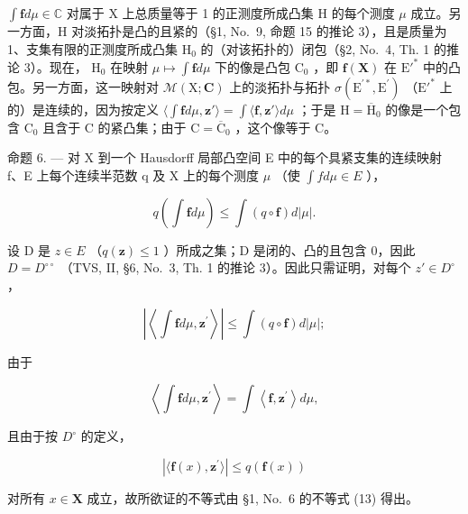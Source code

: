 \(\int \mathbf{f}d\mu \in \mathbb{C}\) 对属于 X 上总质量等于 1 的正测度所成凸集 H 的每个测度 \(\mu\) 成立。另一方面，H 对淡拓扑是凸的且紧的（§1, No.~9, 命题 15 的推论 3），且是质量为 1、支集有限的正测度所成凸集 \(\mathrm{H}_0\) 的（对该拓扑的）闭包（§2, No.~4, Th. 1 的推论 3）。现在， \(\mathrm{H}_0\) 在映射 \(\mu \mapsto \int \mathbf{f}d\mu\) 下的像是凸包 \(\mathrm{C}_0\) ，即 \(\mathbf{f}(\mathbf{X})\) 在 \(\mathrm{E}'^*\) 中的凸包。另一方面，这一映射对 \(\mathcal{M}(\mathrm{X};\mathbf{C})\) 上的淡拓扑与拓扑 \(\sigma (\mathrm{E}^{\prime *},\mathrm{E}^{\prime})\) （\(\mathrm{E}'^*\) 上的）是连续的，因为按定义 \(\langle \int \mathbf{f}d\mu ,\mathbf{z}'\rangle = \int \langle \mathbf{f},\mathbf{z}'\rangle d\mu\) ；于是 \(\mathrm{H} = \overline{\mathrm{H}}_0\) 的像是一个包含 \(\mathrm{C}_0\) 且含于 C 的紧凸集；由于 \(\mathrm{C} = \overline{\mathrm{C}}_0\) ，这个像等于 C。

命题 6. --- 对 X 到一个 Hausdorff 局部凸空间 E 中的每个具紧支集的连续映射 f、E 上每个连续半范数 q 及 X 上的每个测度 \(\mu\) （使 \(\int f d\mu \in E\) ），

\[
q \left(\int \mathbf {f} d \mu\right) \leqslant \int (q \circ \mathbf {f}) d | \mu |.\tag{4}
\]

设 D 是 \(z \in E\) （\(q(\mathbf{z}) \leqslant 1\) ）所成之集；D 是闭的、凸的且包含 0，因此 \(D = D^{\circ\circ}\) （TVS, II, §6, No.~3, Th. 1 的推论 3）。因此只需证明，对每个 \(z' \in D^{\circ}\) ，

\[
\left| \left\langle \int \mathbf {f} d \mu , \mathbf {z} ^ {\prime} \right\rangle \right| \leqslant \int (q \circ \mathbf {f}) d | \mu |;
\]

由于

\[
\left\langle \int \mathbf {f} d \mu , \mathbf {z} ^ {\prime} \right\rangle = \int \left\langle \mathbf {f}, \mathbf {z} ^ {\prime} \right\rangle d \mu ,
\]

且由于按 \(D^{\circ}\) 的定义，

\[
| \langle \mathbf {f} (x), \mathbf {z} ^ {\prime} \rangle | \leqslant q (\mathbf {f} (x))
\]

对所有 \(x \in \mathbf{X}\) 成立，故所欲证的不等式由 §1, No.~6 的不等式 (13) 得出。

